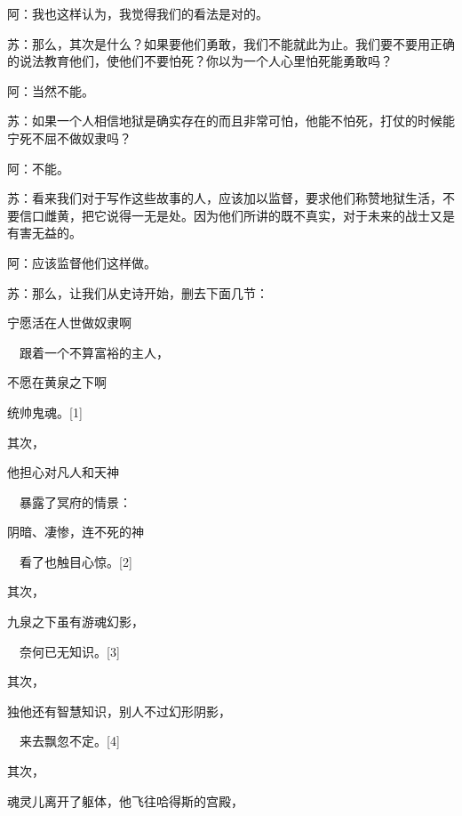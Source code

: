 \documentclass[12pt,oneside]{book}
\begin{document}
阿：我也这样认为，我觉得我们的看法是对的。

苏：那么，其次是什么？如果要他们勇敢，我们不能就此为止。我们要不要用正确的说法教育他们，使他们不要怕死？你以为一个人心里怕死能勇敢吗？

阿：当然不能。

苏：如果一个人相信地狱是确实存在的而且非常可怕，他能不怕死，打仗的时候能宁死不屈不做奴隶吗？

阿：不能。

苏：看来我们对于写作这些故事的人，应该加以监督，要求他们称赞地狱生活，不要信口雌黄，把它说得一无是处。因为他们所讲的既不真实，对于未来的战士又是有害无益的。

阿：应该监督他们这样做。

苏：那么，让我们从史诗开始，删去下面几节：





宁愿活在人世做奴隶啊

　跟着一个不算富裕的主人，

不愿在黄泉之下啊

统帅鬼魂。[1]





其次，





他担心对凡人和天神

　暴露了冥府的情景：

阴暗、凄惨，连不死的神

　看了也触目心惊。[2]





其次，





九泉之下虽有游魂幻影，

　奈何已无知识。[3]





其次，





独他还有智慧知识，别人不过幻形阴影，

　来去飘忽不定。[4]





其次，





魂灵儿离开了躯体，他飞往哈得斯的宫殿，
\end{document}
